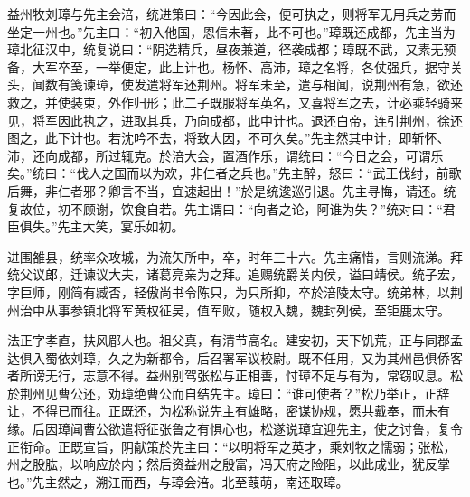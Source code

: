 \documentclass[12pt,UTF8]{ctexbook}
\begin{document}
益州牧刘璋与先主会涪，统进策曰：“今因此会，便可执之，则将军无用兵之劳而坐定一州也。”先主曰：“初入他国，恩信未著，此不可也。”璋既还成都，先主当为璋北征汉中，统复说曰：“阴选精兵，昼夜兼道，径袭成都；璋既不武，又素无预备，大军卒至，一举便定，此上计也。杨怀、高沛，璋之名将，各仗强兵，据守关头，闻数有笺谏璋，使发遣将军还荆州。将军未至，遣与相闻，说荆州有急，欲还救之，并使装束，外作归形；此二子既服将军英名，又喜将军之去，计必乘轻骑来见，将军因此执之，进取其兵，乃向成都，此中计也。退还白帝，连引荆州，徐还图之，此下计也。若沈吟不去，将致大因，不可久矣。”先主然其中计，即斩怀、沛，还向成都，所过辄克。於涪大会，置酒作乐，谓统曰：“今日之会，可谓乐矣。”统曰：“伐人之国而以为欢，非仁者之兵也。”先主醉，怒曰：“武王伐纣，前歌后舞，非仁者邪？卿言不当，宜速起出！”於是统逡巡引退。先主寻悔，请还。统复故位，初不顾谢，饮食自若。先主谓曰：“向者之论，阿谁为失？”统对曰：“君臣俱失。”先主大笑，宴乐如初。

进围雒县，统率众攻城，为流矢所中，卒，时年三十六。先主痛惜，言则流涕。拜统父议郎，迁谏议大夫，诸葛亮亲为之拜。追赐统爵关内侯，谥曰靖侯。统子宏，字巨师，刚简有臧否，轻傲尚书令陈只，为只所抑，卒於涪陵太守。统弟林，以荆州治中从事参镇北将军黄权征吴，值军败，随权入魏，魏封列侯，至钜鹿太守。

法正字孝直，扶风郿人也。祖父真，有清节高名。建安初，天下饥荒，正与同郡孟达俱入蜀依刘璋，久之为新都令，后召署军议校尉。既不任用，又为其州邑俱侨客者所谤无行，志意不得。益州别驾张松与正相善，忖璋不足与有为，常窃叹息。松於荆州见曹公还，劝璋绝曹公而自结先主。璋曰：“谁可使者？”松乃举正，正辞让，不得已而往。正既还，为松称说先主有雄略，密谋协规，愿共戴奉，而未有缘。后因璋闻曹公欲遣将征张鲁之有惧心也，松遂说璋宜迎先主，使之讨鲁，复令正衔命。正既宣旨，阴献策於先主曰：“以明将军之英才，乘刘牧之懦弱；张松，州之股肱，以响应於内；然后资益州之殷富，冯天府之险阻，以此成业，犹反掌也。”先主然之，溯江而西，与璋会涪。北至葭萌，南还取璋。
\end{document}
